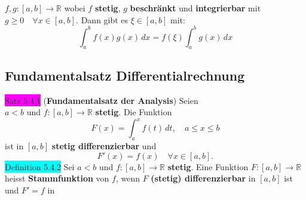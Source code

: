 \documentclass[landscape, 10pt]{article}
\newcommand{\R}{\mathbb{R}}
\begin{document}
\begin{multicols}{3}
{                     $f,g:[a,b]\longrightarrow\R$} wobei 
                     \textcolor{NavyBlue}{$f$} 
                     \textbf{stetig}, 
                     \textcolor{NavyBlue}{$g$} 
                     \textbf{beschränkt} und 
                     \textbf{integrierbar} mit \\
                     \textcolor{NavyBlue}{
                     $g\geqslant0\quad\forall x\in[a,b]$}. 
                     Dann gibt es 
                     \textcolor{NavyBlue}{$\xi\in[a,b]$} mit:
                     \begin{equation*}
                            \int_a^bf(x)g(x)\,dx
                            =f(\xi)\int_a^bg(x)\,dx
                     \end{equation*}
       \subsection{Fundamentalsatz Differentialrechnung}
              \colorbox{magenta}{Satz 5.4.1}
              (\textbf{Fundamentalsatz der Analysis}) 
                     Seien \\ \textcolor{NavyBlue}{$a<b$} und 
                     \textcolor{NavyBlue}{
                     $f:[a,b]\longrightarrow\R$} 
                     \textbf{stetig}. Die Funktion 
                     \begin{equation*}
                            F(x)=\int_a^xf(t)\,dt,
                            \quad a\leqslant x\leqslant b
                     \end{equation*}
                     ist in \textcolor{NavyBlue}{$[a,b]$} 
                     \textbf{stetig differenzierbar} 
                     und 
                     \begin{equation*}
                            F'(x)=f(x)\quad\forall x\in[a,b].
                     \end{equation*}
              \colorbox{cyan}{Definition 5.4.2} 
                     Sei \textcolor{NavyBlue}{$a<b$} und 
                     \textcolor{NavyBlue}{
                     $f:[a,b]\longrightarrow\R$} \textbf{stetig}. 
                     Eine Funktion 
                     \textcolor{NavyBlue}{
                     $F:[a,b]\longrightarrow\R$} heisst 
                     \textbf{Stammfunktion} von 
                     \textcolor{NavyBlue}{$f$}, wenn 
                     \textcolor{NavyBlue}{$F$} 
                     \textbf{(stetig) differenzierbar} in 
                     \textcolor{NavyBlue}{$[a,b]$}
                     ist und \textcolor{NavyBlue}{$F'=f$} in 

\end{multicols}
\end{document}

